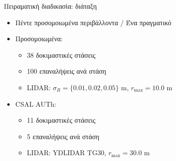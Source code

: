 \begin{frame}{Πειραματική διαδικασία: διάταξη}

  \begin{itemize}
    \item Πέντε προσομοιωμένα περιβάλλοντα / Ένα πραγματικό
    \item Προσομοιωμένα:
      \begin{itemize}
        \item 38 δοκιμαστικές στάσεις
        \item 100 επαναλήψεις ανά στάση
        \item LIDAR: $\sigma_R = \{0.01, 0.02, 0.05\}$ m, $r_{\max} = 10.0$ m
      \end{itemize}
    \item CSAL AUTh:
      \begin{itemize}
        \item 11 δοκιμαστικές στάσεις
        \item 5 επαναλήψεις ανά στάση
        \item LIDAR: YDLIDAR TG30, $r_{\max} = 30.0$ m \\


\end{itemize}
\end{itemize}
\end{frame}
